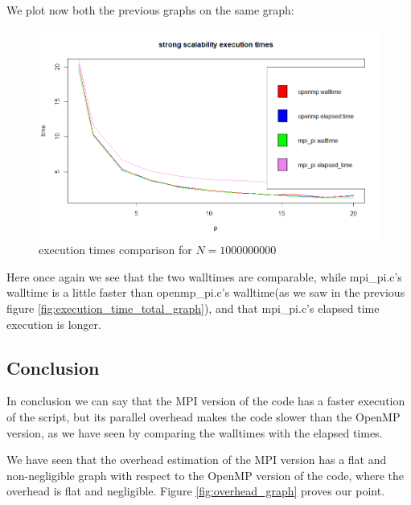 \documentclass{article}
\begin{document}
We plot now both the previous graphs on the same graph:
\begin{figure}[H] %
	\centering
	\includegraphics[width=0.9\columnwidth]{graphs/strong_scaling_times_comparison.png} %
	\caption{execution times comparison for $N=1000000000$}
\end{figure}
Here once again we see that the two walltimes are comparable, while mpi\_pi.c's walltime is a little faster than openmp\_pi.c's walltime(as we saw in the previous figure \ref{fig:execution_time_total_graph}), and that mpi\_pi.c's elapsed time execution is longer. 
\subsection{Conclusion}
In conclusion we can say that the MPI version of the code has a faster execution of the script, but its parallel overhead makes the code slower than the OpenMP version, as we have seen by comparing the walltimes with the elapsed times. 

 We have seen that the overhead estimation of the MPI version has a flat and non-negligible graph  with respect to the OpenMP version of the code, where the overhead is flat and negligible. Figure \ref{fig:overhead_graph} proves our point.






\end{document}
